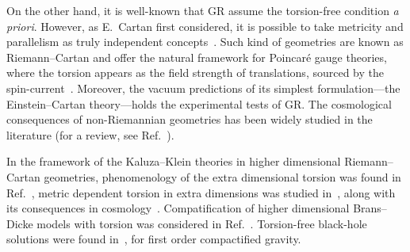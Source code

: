 \documentclass[aps,prd,12pt,superscriptaddress,showpacs,showkeys,longbibliography,reprint,nofootinbib]{revtex4-1}
\begin{document}
On the other hand, it is well-known that GR assume the torsion-free condition {\it a priori}. However, as E.~Cartan first considered, it is possible to take metricity and parallelism as truly independent concepts~\cite{Cartan1922,*Cartan1924,*Cartan1925}. Such kind of geometries are known as Riemann--Cartan and offer the natural framework for Poincar\'e gauge theories, where the torsion appears as the field strength of translations, sourced by the spin-current~\cite{Kibble:1961ba,Sciama:1962,Hehl:1976kj}.
Moreover, the vacuum predictions of its simplest formulation---the Einstein--Cartan theory---holds the experimental tests of GR. The cosmological consequences of non-Riemannian geometries has been widely studied in the literature (for a review, see Ref.~\cite{Puetzfeld:2004yg}). %

In the framework of the Kaluza--Klein theories in higher dimensional Riemann--Cartan geometries, phenomenology of the extra dimensional torsion was found in Ref.~\cite{Kalinowski:1980da}, metric dependent torsion in extra dimensions was studied in~\cite{Shankar:2012vd}, along with its consequences in cosmology~\cite{Chen:2009ep}. Compatification of higher dimensional Brans--Dicke models with torsion was considered in Ref.~\cite{German:1993bq}. Torsion-free black-hole solutions were found in~\cite{Aros:2007nn}, for first order compactified gravity.
\end{document}
